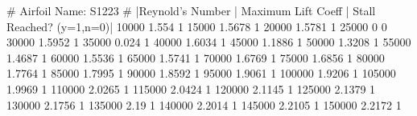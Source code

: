 # Airfoil Name: S1223
# |Reynold's Number | Maximum Lift Coeff | Stall Reached? (y=1,n=0)|
10000 1.554 1
15000 1.5678 1
20000 1.5781 1
25000 0   0
30000 1.5952 1
35000 0.024 1
40000 1.6034 1
45000 1.1886 1
50000 1.3208 1
55000 1.4687 1
60000 1.5536 1
65000 1.5741 1
70000 1.6769 1
75000 1.6856 1
80000 1.7764 1
85000 1.7995 1
90000 1.8592 1
95000 1.9061 1
100000 1.9206 1
105000 1.9969 1
110000 2.0265 1
115000 2.0424 1
120000 2.1145 1
125000 2.1379 1
130000 2.1756 1
135000 2.19 1
140000 2.2014 1
145000 2.2105 1
150000 2.2172 1
